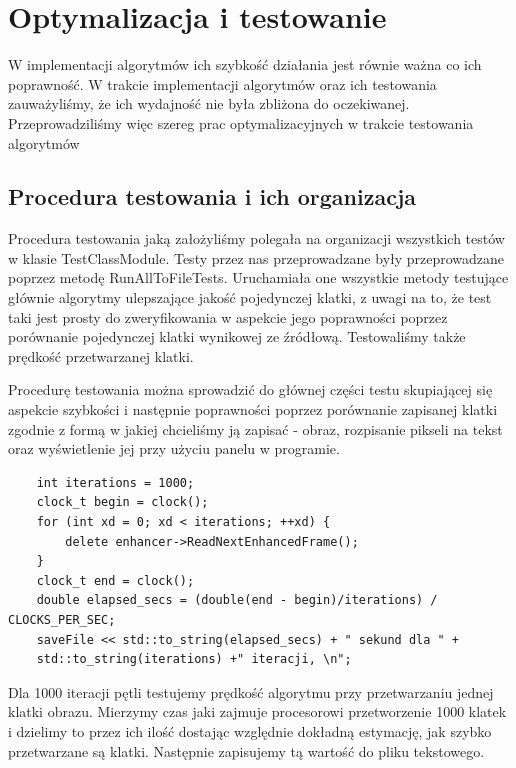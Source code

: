 \documentclass[twoside]{projektInzynierskiMS}
\begin{document}
\section{Optymalizacja i testowanie}
W implementacji algorytmów ich szybkość działania jest równie ważna co ich poprawność. W trakcie implementacji algorytmów oraz ich testowania zauważyliśmy, że ich wydajność nie była zbliżona do oczekiwanej. Przeprowadziliśmy więc szereg prac optymalizacyjnych w trakcie testowania algorytmów
\subsection{Procedura testowania i ich organizacja}
Procedura testowania jaką założyliśmy polegała na organizacji wszystkich testów w klasie TestClassModule. Testy przez nas przeprowadzane były przeprowadzane poprzez metodę RunAllToFileTests. Uruchamiała one wszystkie metody testujące głównie algorytmy ulepszające jakość pojedynczej klatki, z uwagi na to, że test taki jest prosty do zweryfikowania w aspekcie jego poprawności poprzez porównanie pojedynczej klatki wynikowej ze źródłową. Testowaliśmy także prędkość przetwarzanej klatki.

Procedurę testowania można sprowadzić do głównej części testu skupiającej się aspekcie szybkości i następnie poprawności poprzez porównanie zapisanej klatki zgodnie z formą w jakiej chcieliśmy ją zapisać - obraz, rozpisanie pikseli na tekst oraz wyświetlenie jej przy użyciu panelu w programie.

\begin{verbatim}
    int iterations = 1000;
    clock_t begin = clock();
    for (int xd = 0; xd < iterations; ++xd) {
        delete enhancer->ReadNextEnhancedFrame();
    }
    clock_t end = clock();
    double elapsed_secs = (double(end - begin)/iterations) / CLOCKS_PER_SEC;
    saveFile << std::to_string(elapsed_secs) + " sekund dla " + 
    std::to_string(iterations) +" iteracji, \n";
\end{verbatim} 

Dla 1000 iteracji pętli testujemy prędkość algorytmu przy przetwarzaniu jednej klatki obrazu. Mierzymy czas jaki zajmuje procesorowi przetworzenie 1000 klatek i dzielimy to przez ich ilość dostając względnie dokładną estymację, jak szybko przetwarzane są klatki.
Następnie zapisujemy tą wartość do pliku tekstowego.
\end{document}
